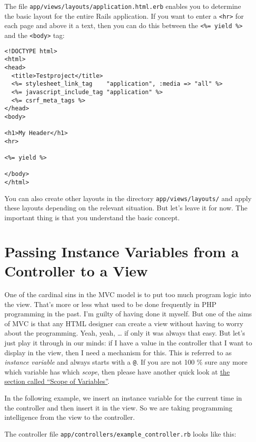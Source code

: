 \documentclass[a4paper]{book}
\newcommand{\chap}[1]{\newpage\thispagestyle{empty}\chapter{#1}\label{chap:\thechapter}}
\begin{document}
The file \texttt{app/views/layouts/application.html.erb} enables you to determine the basic layout for the entire Rails application. If you want to enter a \texttt{\textless{}hr\textgreater{}} for each page and above it a text, then you can do this between the \texttt{\textless{}\%= yield \%\textgreater{}} and the \texttt{\textless{}body\textgreater{}} tag:

\begin{shaded}\begin{verbatim}
<!DOCTYPE html>
<html>
<head>
  <title>Testproject</title>
  <%= stylesheet_link_tag    "application", :media => "all" %>
  <%= javascript_include_tag "application" %>
  <%= csrf_meta_tags %>
</head>
<body>

<h1>My Header</h1>
<hr>

<%= yield %>

</body>
</html>
\end{verbatim}\end{shaded}

You can also create other layouts in the directory \texttt{app/views/layouts/} and apply these layouts depending on the relevant situation. But let's leave it for now. The important thing is that you understand the basic concept.

\chap{Passing Instance Variables from a Controller to a View}\label{passing-instance-variables-from-a-controller-to-a-view}

One of the cardinal sins in the MVC model is to put too much program logic into the view. That's more or less what used to be done frequently in PHP programming in the past. I'm guilty of having done it myself. But one of the aims of MVC is that any HTML designer can create a view without having to worry about the programming. Yeah, yeah, \ldots{} if only it was always that easy. But let's just play it through in our minds: if I have a value in the controller that I want to display in the view, then I need a mechanism for this. This is referred to as \emph{instance variable} and always starts with a \texttt{@}. If you are not 100 \% sure any more which variable has which \emph{scope}, then please have another quick look at \hyperref[scopeux5fvonux5fvariablen]{the section called “Scope of Variables”}.

In the following example, we insert an instance variable for the current time in the controller and then insert it in the view. So we are taking programming intelligence from the view to the controller.

The controller file \texttt{app/controllers/example\_controller.rb} looks like this:
\end{document}
